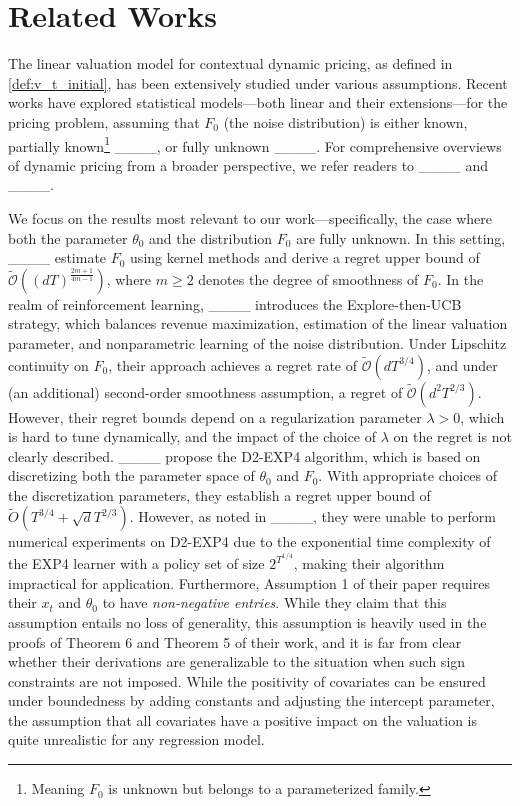 \section{Related Works}
\label{sec:related}
The linear valuation model for contextual dynamic pricing, as defined in \cref{def:v_t_initial}, has been extensively studied under various assumptions. Recent works have explored statistical models—both linear and their extensions—for the pricing problem, assuming that $F_0$ (the noise distribution) is either known, partially known\footnote{Meaning $F_0$ is unknown but belongs to a parameterized family.} ____, or fully unknown ____. For comprehensive overviews of dynamic pricing from a broader perspective, we refer readers to ____ and ____.

We focus on the results most relevant to our 
work—specifically, the case where both the parameter $\theta_0$ and the distribution $F_0$ are fully unknown. In this setting, ____ estimate $F_0$ using kernel methods and derive a regret upper bound of $\widetilde{\mathcal{O}}((dT)^{\frac{2m+1}{4m-1}})$, where $m \geq 2$ denotes the degree of smoothness of $F_0$. In the realm of reinforcement learning, ____ introduces the Explore-then-UCB strategy, which balances revenue maximization, estimation of the linear valuation parameter, and nonparametric learning of the noise distribution. Under Lipschitz continuity on $F_0$, their approach achieves a regret rate of $\widetilde{\mathcal{O}}(d T^{3/4})$, and under (an additional) second-order smoothness assumption, a regret of $\widetilde{\mathcal{O}}(d^2T^{2/3})$. However, their regret bounds depend on a regularization parameter $\lambda > 0$, which is hard to tune dynamically, and the impact of the choice of $\lambda$ on the regret is not clearly described. ____ propose the D2-EXP4 algorithm, which is based on discretizing both the parameter space of $\theta_0$ and $F_0$. With appropriate choices of the discretization parameters, they establish a regret upper bound of $\widetilde{O}(T^{3/4} +\sqrt{d} T^{2/3})$. However, as noted in ____, they were unable to perform numerical experiments on D2-EXP4 due to the exponential time complexity of the EXP4 learner with a policy set of size $2^{T^{1/4}}$, making their algorithm impractical for application. 
Furthermore, Assumption 1 of their paper requires their $x_t$ and $\theta_0$ to have \emph{non-negative entries}. While they claim that this assumption entails no loss of generality, this assumption is heavily used in the proofs of Theorem 6 and Theorem 5 of their work, and it is far from clear whether their derivations are generalizable to the situation when such sign constraints are not imposed. While the positivity of covariates can be ensured under boundedness by adding constants and adjusting the intercept parameter, the assumption that all covariates have a positive impact on the valuation is quite unrealistic for any regression model. 
